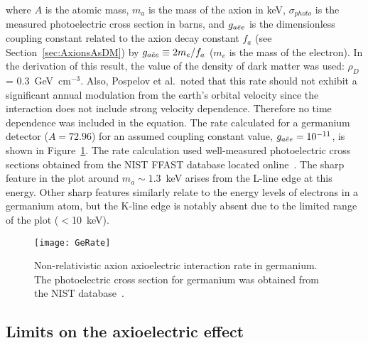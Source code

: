 where $A$ is the atomic mass, $m_{a}$ is the mass of the axion in keV, $\sigma_{photo}$ is the measured photoelectric cross section in barns, and $g_{a\bar{e}e}$ is the dimensionless coupling constant related to the axion decay constant $f_{a}$ (see Section~\ref{sec:AxionsAsDM}) by $g_{a\bar{e}e} \equiv 2 m_{e}/ f_{a}$ ($m_{e}$ is the mass of the electron).  In the derivation of this result, the value of the density of dark matter was used: $\rho_{D}$ = 0.3~GeV~cm$^{-3}$.  Also, Pospelov et al.~noted that this rate should not exhibit a significant annual modulation from the earth's orbital velocity since the interaction does not include strong velocity dependence.  Therefore no time dependence was included in the equation.  The rate calculated for a germanium detector ($A=72.96$) for an assumed coupling constant value, $g_{a\bar{e}e} = 10^{-11}$, is shown in Figure~\ref{fig:HeavyAxionSignalRate}.  The rate calculation used well-measured photoelectric cross sections obtained from the NIST FFAST database located online~\cite{chantler:597}.  The sharp feature in the plot around $m_{a}\sim1.3$~keV arises from the L-line edge at this energy.  Other sharp features similarly relate to the energy levels of electrons in a germanium atom, but the K-line edge is notably absent due to the limited range of the plot ($<$10~keV).  



		\begin{figure}
			\centering
			\texttt{[image: GeRate]}
			\caption[Axioelectric interaction rate in germanium]{Non-relativistic axion axioelectric 
			interaction rate in germanium.  The photoelectric cross section for germanium was obtained
			from the NIST database~\cite{chantler:597}.}
			\label{fig:HeavyAxionSignalRate}
		\end{figure}

	\subsection{Limits on the axioelectric effect}
	\label{sec:CalcLimitsOnHeavyAxionLimits}		
		
